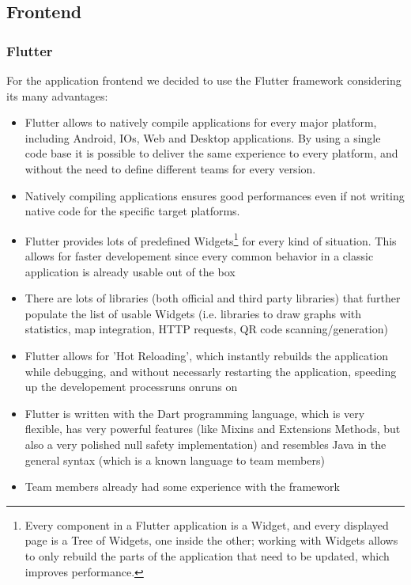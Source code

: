 \clearpage

\subsection{Frontend}
\subsubsection{Flutter}

For the application frontend we decided to use the Flutter framework considering its many advantages:
\begin{itemize}
    \item Flutter allows to natively compile applications for every major platform, including Android, IOs, Web and Desktop applications. By using a single code base it is possible to deliver the same experience to every platform, and without the need to define different teams for every version.
    \item Natively compiling applications ensures good performances even if not writing native code for the specific target platforms.
    \item Flutter provides lots of predefined Widgets\footnote{Every component in a Flutter application is a Widget, and every displayed page is a Tree of Widgets, one inside the other; working with Widgets allows to only rebuild the parts of the application that need to be updated, which improves performance.} for every kind of situation. This allows for faster developement since every common behavior in a classic application is already usable out of the box
    \item There are lots of libraries (both official and third party libraries) that further populate the list of usable Widgets (i.e. libraries to draw graphs with statistics, map integration, HTTP requests, QR code scanning/generation)
    \item Flutter allows for 'Hot Reloading', which instantly rebuilds the application while debugging, and without necessarly restarting the application, speeding up the developement processruns onruns on
    \item Flutter is written with the Dart programming language, which is very flexible, has very powerful features (like Mixins and Extensions Methods, but also a very polished null safety implementation) and resembles Java in the general syntax (which is a known language to team members)
    \item Team members already had some experience with the framework
\end{itemize}

